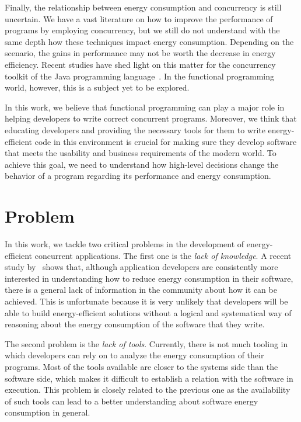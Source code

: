 Finally, the relationship between energy consumption and concurrency is still uncertain. We have a vast literature on how to improve the performance of programs by employing concurrency, but we still do not understand with the same depth how these techniques impact energy consumption. Depending on the scenario, the gains in performance may not be worth the decrease in energy efficiency. Recent studies have shed light on this matter for the concurrency toolkit of the Java programming language~\cite{pinto:2014,pinto:2016}. In the functional programming world, however, this is a subject yet to be explored.

In this work, we believe that functional programming can play a major role in helping developers to write correct concurrent programs. Moreover, we think that educating developers and providing the necessary tools for them to write energy-efficient code in this environment is crucial for making sure they develop software that meets the usability and business requirements of the modern world. To achieve this goal, we need to understand how high-level decisions change the behavior of a program regarding its performance and energy consumption.


\section{Problem}
In this work, we tackle two critical problems in the development of energy-efficient concurrent applications. The first one is the \emph{lack of knowledge}. A recent study by~ shows that, although application developers are consistently more interested in understanding how to reduce energy consumption in their software, there is a general lack of information in the community about how it can be achieved. This is unfortunate because it is very unlikely that developers will be able to build energy-efficient solutions without a logical and systematical way of reasoning about the energy consumption of the software that they write.

The second problem is the \emph{lack of tools}. Currently, there is not much tooling in which developers can rely on to analyze the energy consumption of their programs. Most of the tools available are closer to the systems side than the software side, which makes it difficult to establish a relation with the software in execution. This problem is closely related to the previous one as the availability of such tools can lead to a better understanding about software energy consumption in general.


